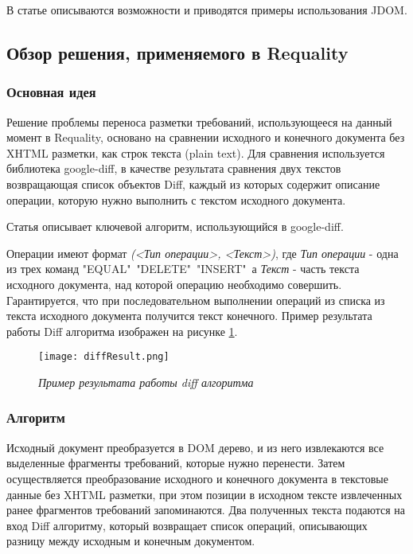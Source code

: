 В статье \cite{web:JDOM} описываются возможности и приводятся примеры использования JDOM.

\subsection{Обзор решения, применяемого в Requality}

\subsubsection{Основная идея}

Решение проблемы переноса разметки требований, использующееся на данный момент в Requality, основано на сравнении исходного и конечного документа без XHTML разметки, как строк текста (plain text). Для сравнения используется библиотека google-diff, в качестве результата сравнения двух текстов возвращающая список объектов Diff, каждый из которых содержит описание операции, которую нужно выполнить с текстом исходного документа.

Статья \cite{web:Diff} описывает ключевой алгоритм, использующийся в google-diff.

Операции имеют формат \emph{(<Тип операции>, <Текст>)}, где \emph{Тип операции} - одна из трех команд "EQUAL"\, "DELETE"\, "INSERT"\, а \emph{Текст} - часть текста исходного документа, над которой операцию необходимо совершить. Гарантируется, что при последовательном выполнении операций из списка из текста исходного документа получится текст конечного. Пример результата работы Diff алгоритма изображен на рисунке \ref{pr:image5}.

\begin{figure}[h]
\begin{center}
\texttt{[image: diffResult.png]}
\caption{\emph{Пример результата работы diff алгоритма}}
\label{pr:image5}
\end{center}
\end{figure}

\subsubsection{Алгоритм}

Исходный документ преобразуется в DOM дерево, и из него извлекаются все выделенные фрагменты требований, которые нужно перенести. Затем осуществляется преобразование исходного и конечного документа в текстовые данные без XHTML разметки, при этом позиции в исходном тексте извлеченных ранее фрагментов требований запоминаются. Два полученных текста подаются на вход Diff алгоритму, который возвращает список операций, описывающих разницу между исходным и конечным документом.

